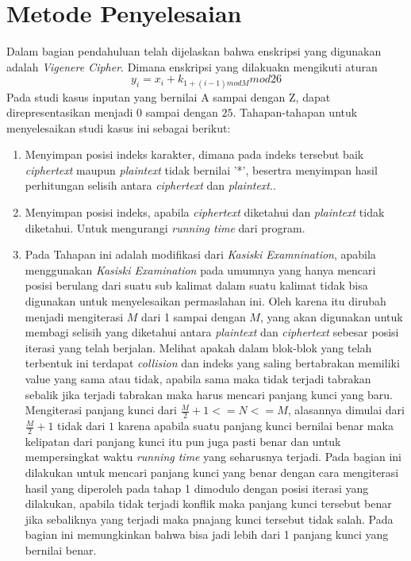 \section{Metode Penyelesaian}
Dalam bagian pendahuluan telah dijelaskan bahwa enskripsi yang digunakan adalah \textit{Vigenere Cipher}. Dimana enskripsi yang dilakuakn mengikuti aturan 
\begin{equation}
	y_i=x_i+k_{1+(i-1)mod M} mod 26 
\end{equation}
Pada studi kasus inputan yang bernilai A sampai dengan Z, dapat direpresentasikan menjadi $0$ sampai dengan $25$. 
Tahapan-tahapan untuk menyelesaikan studi kasus ini sebagai berikut:
\begin{enumerate}
\item Menyimpan posisi indeks karakter, dimana pada indeks tersebut baik \textit{ciphertext} maupun \textit{plaintext} tidak bernilai '*', besertra menyimpan hasil perhitungan selisih antara \textit{ciphertext} dan \textit{plaintext}.\cite{john_jones_spoj_2009}.
	\item Menyimpan posisi indeks, apabila \textit{ciphertext} diketahui dan \textit{plaintext} tidak diketahui. Untuk mengurangi \textit{running time} dari program\cite{john_jones_spoj_2009}.
	\item Pada Tahapan ini adalah modifikasi dari \textit{Kasiski Examnination}, apabila menggunakan \textit{Kasiski Examination} pada umumnya yang hanya mencari posisi berulang dari suatu sub kalimat dalam suatu kalimat tidak bisa digunakan untuk menyelesaikan permaslahan ini. Oleh karena itu dirubah menjadi mengiterasi $M$ dari 1 sampai dengan $M$, yang akan digunakan untuk membagi selisih yang diketahui antara \textit{plaintext} dan \textit{ciphertext} sebesar posisi iterasi yang telah berjalan. Melihat apakah dalam blok-blok yang telah terbentuk ini terdapat \textit{collision} dan indeks yang saling bertabrakan memiliki value yang sama atau tidak, apabila sama maka tidak terjadi tabrakan sebalik jika terjadi tabrakan maka harus mencari panjang kunci yang baru. Mengiterasi panjang kunci dari $\frac{M}{2}+1<=N<=M$, alasannya dimulai dari $\frac{M}{2}+1$ tidak dari $1$ karena apabila suatu panjang kunci bernilai benar maka kelipatan dari panjang kunci itu pun juga pasti benar dan untuk mempersingkat waktu \textit{running time} yang seharusnya terjadi. Pada bagian ini dilakukan untuk mencari panjang kunci yang benar dengan cara mengiterasi hasil yang diperoleh pada tahap 1 dimodulo dengan posisi iterasi yang dilakukan, apabila tidak terjadi konflik maka panjang kunci tersebut benar jika sebaliknya yang terjadi maka pnajang kunci tersebut tidak salah. Pada bagian ini memungkinkan bahwa bisa jadi lebih dari 1 panjang kunci yang bernilai benar.  

\end{enumerate}
